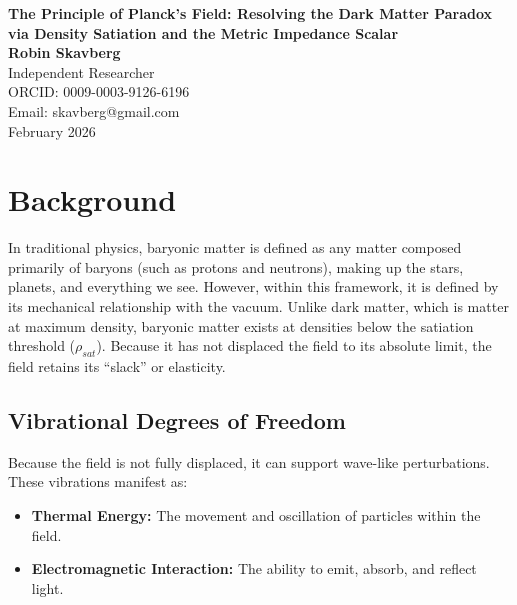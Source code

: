 \documentclass[12pt,a4paper]{article}
\begin{document}
\begin{center}
    \large \textbf{The Principle of Planck’s Field: Resolving the Dark Matter Paradox via Density Satiation and the Metric Impedance Scalar} \\
    \vspace{1em}
    \normalsize \textbf{Robin Skavberg} \\
    \normalsize Independent Researcher \\
    \normalsize ORCID: 0009-0003-9126-6196 \\
    \normalsize Email: skavberg@gmail.com \\
    \vspace{1em}
    \normalsize February 2026
\end{center}

\begin{abstract}

This paper identifies Dark Matter as a state of maximum density satiation within the Total Field. We demonstrate that any mass, regardless of scale, transitions from a baryonic (vibrational) state to a dark (non-vibrational) state upon reaching its satiation radius $R_{sat}$. At this limit, the Metric Impedance Scalar $\zeta$ becomes infinite, resulting in a "Frozen Core" characterized by a total absence of internal degrees of freedom. We provide the mathematical proof that the neutrino’s known mass-to-radius ratio places it naturally within this satiated regime, effectively classifying the neutrino as the fundamental subatomic constituent of the Dark Matter energy density.
\end{abstract}

\section{Background}
In traditional physics, baryonic matter is defined as any matter composed primarily of baryons (such as protons and neutrons), making up the stars, planets, and everything we see. However, within this framework, it is defined by its mechanical relationship with the vacuum. Unlike dark matter, which is matter at maximum density, baryonic matter exists at densities below the satiation threshold ($\rho_{sat}$). Because it has not displaced the field to its absolute limit, the field retains its ``slack'' or elasticity.

\subsection{Vibrational Degrees of Freedom}
Because the field is not fully displaced, it can support wave-like perturbations. These vibrations manifest as:
\begin{itemize}
    \item \textbf{Thermal Energy:} The movement and oscillation of particles within the field.
    \item \textbf{Electromagnetic Interaction:} The ability to emit, absorb, and reflect light.
\end{itemize}
\end{document}
